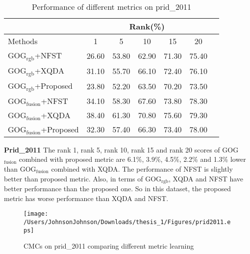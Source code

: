 \begin{table}[H]
\centering
\caption{Performance of different metrics on prid\_2011}
\begin{tabular}{|l|c|c|c|c|c|c|}
\hline
& \multicolumn{5}{|c|}{Rank(\%)} \\
\hline
Methods& 1 & 5 &10& 15&20\\
\hline
GOG$_\text{rgb}$+NFST&26.60 &53.80& 62.90&71.30&75.40 \\ 
\hline
GOG$_\text{rgb}$+XQDA&31.10 & 55.70& 66.10 & 72.40&76.10\\  
\hline
GOG$_\text{rgb}$+Proposed&23.80&52.20&63.50&70.20&73.50\\  %
\hline
GOG$_\text{fusion}$+NFST&34.10 &58.30& 67.60&73.80&78.30 \\  
\hline
GOG$_\text{fusion}$+XQDA&38.40& 61.30&70.80&75.60&79.30\\
\hline
GOG$_\text{fusion}$+Proposed&32.30&57.40&66.30&73.40&78.00\\ %

\hline

\end{tabular}\newline
\end{table}

\textbf{Prid\_2011}  The  rank 1, rank 5, rank 10, rank 15 and rank 20 scores of GOG$_\text{fusion}$  combined with proposed metric are 6.1\%, 3.9\%, 4.5\%, 2.2\% and 1.3\% lower than GOG$_\text{fusion}$ combined with XQDA. The performance of NFST is slightly better than proposed metric. Also, in terms of GOG$_\text{rgb}$, XQDA and NFST have better performance than the proposed one. So in this dataset, the proposed metric has worse performance than XQDA and NFST.

\begin{figure}[H]
\begin{raggedleft}
\texttt{[image: /Users/JohnsonJohnson/Downloads/thesis\_1/Figures/prid2011.eps]}
\vspace{-3em}
\caption{CMCs on prid\_2011 comparing different metric learning}
\end{raggedleft}
\end{figure}

